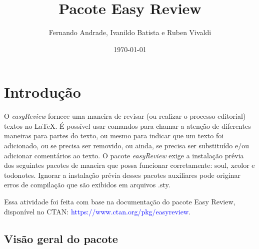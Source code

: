 \documentclass[12pt,openright,oneside,a4paper,sumario=tradicional,brazil]{abntex2}
\title{Pacote Easy Review}
\author{Fernando Andrade, Ivanildo Batista e Ruben Vivaldi}
\date{\today}
\begin{document}
\pretextual
\imprimircapa
{}
\tableofcontents
\newpage
\textual
{}

\chapter{Introdução}
O \textit{easyReview} fornece uma maneira de revisar (ou realizar o processo editorial) textos no \LaTeX. É possível usar comandos para chamar a atenção de diferentes maneiras para partes do texto, ou mesmo para indicar que um texto foi adicionado, ou se precisa ser removido, ou ainda, se precisa ser substituído e/ou adicionar comentários ao texto. O pacote \textit{easyReview} exige a instalação prévia dos seguintes pacotes de maneira que possa funcionar corretamente: soul, xcolor e todonotes. Ignorar a instalação prévia desses pacotes auxiliares pode originar erros de compilação que são exibidos em arquivos .sty.

Essa atividade foi feita com base na documentação do pacote Easy Review, disponível no CTAN: \textcolor{blue}{https://www.ctan.org/pkg/easyreview}.

\section{Visão geral do pacote}
\end{document}
